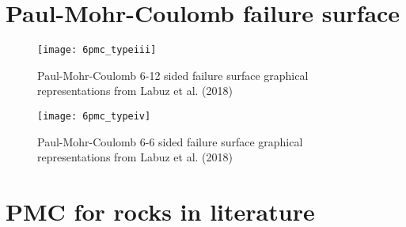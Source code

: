 \chapter{Paul-Mohr-Coulomb failure surface}\label{App:D}

\begin{figure}
    \centering
    \texttt{[image: 6pmc\_typeiii]}
    \caption{Paul-Mohr-Coulomb 6-12 sided failure surface graphical representations from Labuz et al. (2018) \cite{Labuz2018}}
    \label{fig5:6pmc_typeiii}
\end{figure}

\begin{figure}
    \centering
    \texttt{[image: 6pmc\_typeiv]}
    \caption{Paul-Mohr-Coulomb 6-6 sided failure surface graphical representations from Labuz et al. (2018) \cite{Labuz2018}}
    \label{fig5:6pmc_typeiv}
\end{figure}

\chapter{PMC for rocks in literature}\label{App:E}

